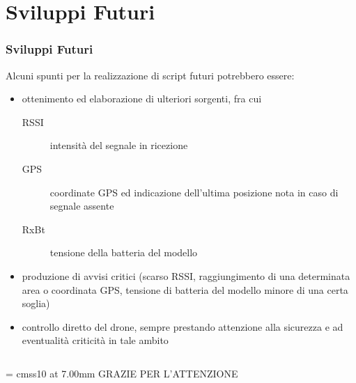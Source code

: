 \documentclass{beamer}
\begin{document}
\section{Sviluppi Futuri}
\begin{frame}
        \frametitle{Sviluppi Futuri}
        Alcuni spunti per la realizzazione di script futuri potrebbero essere:
        
        \begin{itemize}
                \item ottenimento ed elaborazione di ulteriori sorgenti, fra cui
                        
                        \begin{description}
                                        \item[RSSI] intensità del segnale in ricezione
                                                
                                        \item[GPS] coordinate GPS ed indicazione dell'ultima posizione nota in caso di segnale assente
                                                
                                        \item[RxBt] tensione della batteria del modello
                                                
                        \end{description}
                \item produzione di avvisi critici (scarso RSSI, raggiungimento di una determinata area o coordinata GPS, tensione di batteria del modello minore di una certa soglia)
                        
                \item controllo diretto del drone, sempre prestando attenzione alla sicurezza e ad eventualità criticità in tale ambito
        \end{itemize}
\end{frame}


\begin{frame}
        \begin{columns}
                \begin{column}{0.75\textwidth}
                        \begin{center}
                                \font\endfont = cmss10 at 7.00mm
                                \color{uniudBrown}
                                \endfont 
                                GRAZIE PER L'ATTENZIONE
                                \baselineskip 20.0mm
                        \end{center}    

                \end{column}
        \end{columns}
\end{frame}


\end{document}
